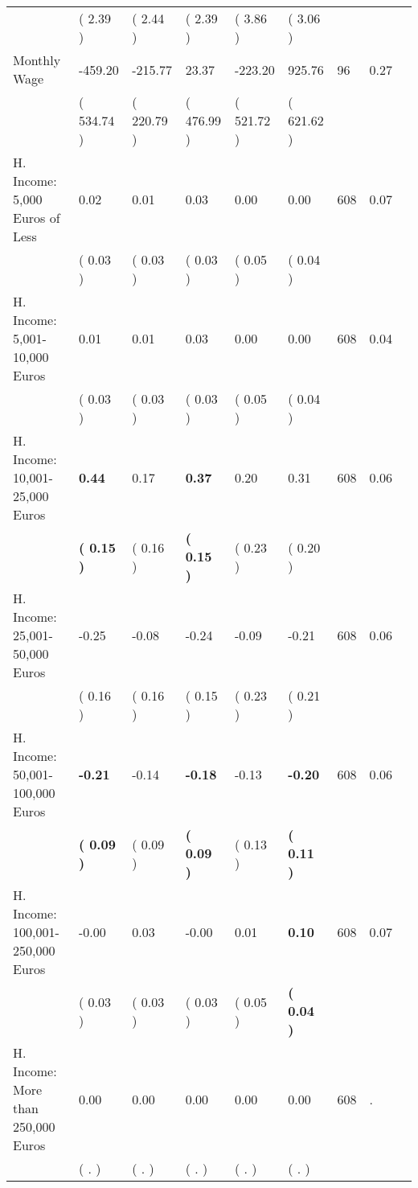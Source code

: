 \begin{tabular}{L{6.2cm} C{1.8cm} C{1.8cm} C{1.8cm} C{1.8cm} C{1.8cm} C{1.8cm} C{0.3cm} C{0.3cm}}
 & (     2.39 ) & (     2.44 ) & (     2.39 ) & (     3.86 ) & (     3.06 )  & \\
Monthly Wage &   -459.20 &   -215.77 &     23.37 &   -223.20 &    925.76  & 96 &       0.27 \\ 
 & (   534.74 ) & (   220.79 ) & (   476.99 ) & (   521.72 ) & (   621.62 )  & \\
H. Income: 5,000 Euros of Less &      0.02 &      0.01 &      0.03 &      0.00 &      0.00  & 608 &       0.07 \\ 
 & (     0.03 ) & (     0.03 ) & (     0.03 ) & (     0.05 ) & (     0.04 )  & \\
H. Income: 5,001-10,000 Euros &      0.01 &      0.01 &      0.03 &      0.00 &      0.00  & 608 &       0.04 \\ 
 & (     0.03 ) & (     0.03 ) & (     0.03 ) & (     0.05 ) & (     0.04 )  & \\
H. Income: 10,001-25,000 Euros & \textbf{     0.44} &      0.17 & \textbf{     0.37} &      0.20 &      0.31  & 608 &       0.06 \\ 
 & \textbf{(     0.15 )} & (     0.16 ) & \textbf{(     0.15 )} & (     0.23 ) & (     0.20 )  & \\
H. Income: 25,001-50,000 Euros &     -0.25 &     -0.08 &     -0.24 &     -0.09 &     -0.21  & 608 &       0.06 \\ 
 & (     0.16 ) & (     0.16 ) & (     0.15 ) & (     0.23 ) & (     0.21 )  & \\
H. Income: 50,001-100,000 Euros & \textbf{    -0.21} &     -0.14 & \textbf{    -0.18} &     -0.13 & \textbf{    -0.20}  & 608 &       0.06 \\ 
 & \textbf{(     0.09 )} & (     0.09 ) & \textbf{(     0.09 )} & (     0.13 ) & \textbf{(     0.11 )}  & \\
H. Income: 100,001-250,000 Euros &     -0.00 &      0.03 &     -0.00 &      0.01 & \textbf{     0.10}  & 608 &       0.07 \\ 
 & (     0.03 ) & (     0.03 ) & (     0.03 ) & (     0.05 ) & \textbf{(     0.04 )}  & \\
H. Income: More than 250,000 Euros &      0.00 &      0.00 &      0.00 &      0.00 &      0.00  & 608 &          . \\ 
 & (        . ) & (        . ) & (        . ) & (        . ) & (        . )  & \\
\bottomrule
\end{tabular}
